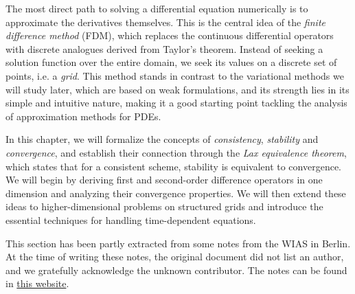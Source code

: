 The most direct path to solving a differential equation numerically is to approximate the derivatives themselves. This is the central idea of the \emph{finite difference method} (FDM), which replaces the continuous differential operators with discrete analogues derived from Taylor's theorem. Instead of seeking a solution function over the entire domain, we seek its values on a discrete set of points, i.e. a \emph{grid}. This method stands in contrast to the variational methods we will study later, which are based on weak formulations, and its strength lies in its simple and intuitive nature, making it a good starting point tackling the analysis of approximation methods for PDEs. 

In this chapter, we will formalize the concepts of \emph{consistency}, \emph{stability} and \emph{convergence}, and establish their connection through the \emph{Lax equivalence theorem}, which states that for a consistent scheme, stability is equivalent to convergence. We will begin by deriving first and second-order difference operators in one dimension and analyzing their convergence properties. We will then extend these ideas to higher-dimensional problems on structured grids and introduce the essential techniques for handling time-dependent equations.

This section has been partly extracted from some notes from the WIAS in Berlin. At the time of writing these notes, the original document did not list an author, and we gratefully acknowledge the unknown contributor. The notes can be found in \href{https://www.wias-berlin.de/people/john/LEHRE/NUMERIK\_IV\_21\_22/num\_konv\_dom\_prob\_3.pdf}{this website}.

